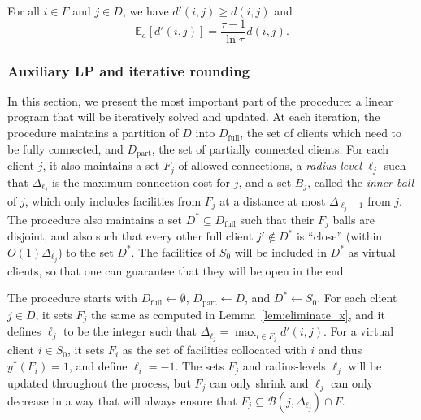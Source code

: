 \begin{lemma} \label{lem:random_dist}
For all $i \in F$ and $j \in D$, we have $d'(i, j) \ge d(i, j)$ and 
\[ \mathbb{E}_a[d'(i, j)] = \frac{\tau - 1}{\ln \tau} d(i, j). \]
\end{lemma}

\subsubsection{Auxiliary LP and iterative rounding}
In this section, we present the most important part of the procedure: a linear program that will be iteratively solved and updated. At each iteration, the procedure maintains a partition of $D$ into $D_\text{full}$, the set of clients which need to be fully connected, and $D_\text{part}$, the set of partially connected clients. For each client $j$, it also maintains a set $F_j$ of allowed connections, a \emph{radius-level} $\ell_j$ such that $\Delta_{\ell_j}$ is the maximum connection cost for $j$, and a set $B_j$, called the \emph{inner-ball} of $j$, which only includes facilities from $F_j$ at a distance at most $\Delta_{\ell_j - 1}$ from $j$. The procedure also maintains a set $D^* \subseteq D_\text{full}$ such that their $F_j$ balls are disjoint, and also such that every other full client $j' \notin D^*$ is ``close'' (within $O(1)\Delta_{\ell_j}$) to the set $D^*$. The facilities of $S_0$ will be included in $D^*$ as virtual clients, so that one can guarantee that they will be open in the end.

The procedure starts with $D_\text{full} \gets \emptyset$, $D_\text{part} \gets D$, and $D^* \gets S_0$. For each client $j \in D$, it sets $F_j$ the same as computed in Lemma~\ref{lem:eliminate_x}, and it defines $\ell_j$ to be the integer such that $\Delta_{\ell_j} = \max_{i \in F_j} d'(i,j)$. For a virtual client $i \in S_0$, it sets $F_i$ as the set of facilities collocated with $i$ and thus $y^*(F_i) = 1$, and define $\ell_i = -1$. The sets $F_j$ and radius-levels $\ell_j$ will be updated throughout the process, but $F_j$ can only shrink and $\ell_j$ can only decrease in a way that will always ensure that $F_j \subseteq \mathcal{B}(j,\Delta_{\ell_j}) \cap F$.

